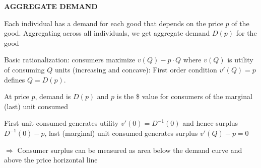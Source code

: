\documentclass[landscape]{slides}
\begin{document}
%


%
%

%

\begin{slide}
\begin{center}
{\bf AGGREGATE DEMAND}
\end{center}
Each individual has a demand for each good that depends on the price $p$ of the good.
Aggregating across all individuals, we get
aggregate demand $D(p)$ for the good


Basic rationalization: consumers maximize $v(Q)- p \cdot Q$ where $v(Q)$ is utility of consuming $Q$ units (increasing and concave): First order condition $v'(Q)=p$ defines $Q=D(p)$.

At price $p$, demand is $D(p)$ and $p$ is the \$ value for consumers of the marginal
(last) unit consumed

First unit consumed generates utility $v'(0)=D^{-1}(0)$ and hence surplus $D^{-1}(0) - p$, last (marginal) unit consumed generates surplus $v'(Q)-p=0$ 

$\Rightarrow$ Consumer surplus can be measured as area below the demand curve
and above the price horizontal line



\end{slide}

\begin{slide}

\end{slide}
\end{document}
